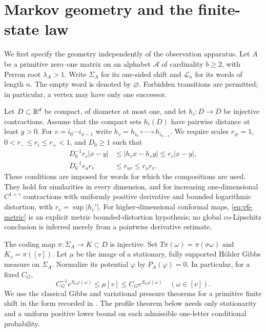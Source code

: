 \section{Markov geometry and the finite-state law}\label{sec:v6-model}
We first specify the geometry independently of the observation apparatus.
Let $A$ be a primitive zero--one matrix on an alphabet $\mathcal A$ of
cardinality $b\ge2$, with Perron root $\lambda_A>1$. Write $\Sigma_A$
for its one-sided shift and $\mathcal L_n$ for its words of length $n$.
The empty word is denoted by $\varnothing$. Forbidden transitions are
permitted; in particular, a vertex may have only one successor.

Let $D\subset\mathbb R^d$ be compact, of diameter at most one, and let
$h_i:D\to D$ be injective contractions. Assume that the compact sets
$h_i(D)$ have pairwise distance at least $g>0$. For $v=i_0\cdots i_{n-1}$
write $h_v=h_{i_0}\circ\cdots\circ h_{i_{n-1}}$. We require scales
$r_\varnothing=1$, $0<r_-\le r_i\le r_+<1$, and $D_0\ge1$ such that
\begin{align}
 D_0^{-1}r_v|x-y|&\le |h_vx-h_vy|\le r_v|x-y|,
                                                        \label{eq:v6-metric}\\
 D_0^{-1}r_ur_v&\le r_{uv}\le r_ur_v.                    \label{eq:v6-scales}
\end{align}
These conditions are imposed for words for which the compositions are
used. They hold for similarities in every dimension, and for increasing
one-dimensional $C^{1+\gamma}$ contractions with uniformly positive
derivative and bounded logarithmic distortion, with $r_v=\sup|h_v'|$.
For higher-dimensional conformal maps, \eqref{eq:v6-metric} is an explicit
metric bounded-distortion hypothesis; no global co-Lipschitz conclusion
is inferred merely from a pointwise derivative estimate.

The coding map $\pi:\Sigma_A\to K\subset D$ is injective. Set
$T\pi(\omega)=\pi(\sigma\omega)$ and $K_v=\pi([v])$.
Let $\mu$ be the image of a stationary, fully supported H\"older Gibbs
measure on $\Sigma_A$. Normalize its potential $\varphi$ by
$P_A(\varphi)=0$. In particular, for a fixed $C_G$,
\begin{equation}
 C_G^{-1}e^{S_n\varphi(\omega)}\le\mu[v]\le
 C_Ge^{S_n\varphi(\omega)}\quad(\omega\in[v]).             \label{eq:v6-gibbs}
\end{equation}
We use the classical Gibbs and variational pressure theorems for a
primitive finite shift in the form recorded in \cite{Bowen2008}.
The profile theorem below needs only stationarity and a uniform positive
lower bound on each admissible one-letter conditional probability.

